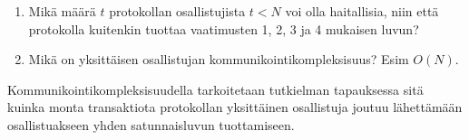 \begin{enumerate}
    \item Mikä määrä $t$ protokollan osallistujista $t < N$ voi olla haitallisia, niin että protokolla kuitenkin tuottaa vaatimusten 1, 2, 3 ja 4 mukaisen luvun?
    \item Mikä on yksittäisen osallistujan kommunikointikompleksisuus? Esim $O(N)$.
\end{enumerate}

Kommunikointikompleksisuudella tarkoitetaan tutkielman tapauksessa sitä kuinka monta transaktiota protokollan yksittäinen osallistuja joutuu lähettämään osallistuakseen yhden satunnaisluvun tuottamiseen. 